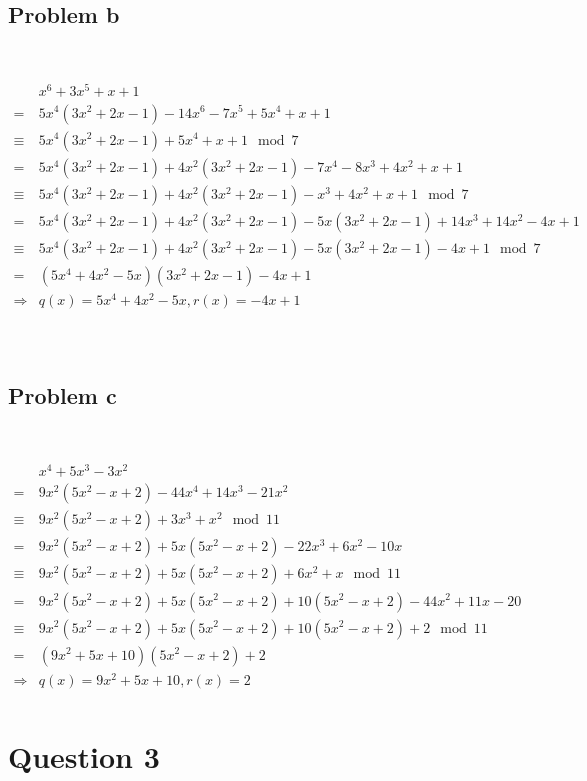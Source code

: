 \documentclass{article}
\begin{document}
~

\subsection*{Problem b}

~

\begin{align*}
    &x^6+3x^5+x+1\\
    =&5x^4(3x^2+2x-1)-14x^6-7x^5+5x^4+x+1\\
    \equiv&5x^4(3x^2+2x-1)+5x^4+x+1\mod 7\\
    =&5x^4(3x^2+2x-1)+4x^2(3x^2+2x-1)-7x^4-8x^3+4x^2+x+1\\
    \equiv&5x^4(3x^2+2x-1)+4x^2(3x^2+2x-1)-x^3+4x^2+x+1\mod 7\\
    =&5x^4(3x^2+2x-1)+4x^2(3x^2+2x-1)-5x(3x^2+2x-1)+14x^3+14x^2-4x+1\\
    \equiv&5x^4(3x^2+2x-1)+4x^2(3x^2+2x-1)-5x(3x^2+2x-1)-4x+1\mod 7\\
    =&(5x^4+4x^2-5x)(3x^2+2x-1)-4x+1\\
    \Rightarrow&q(x)=5x^4+4x^2-5x,r(x)=-4x+1\\
\end{align*}

~

\subsection*{Problem c}

~

\begin{align*}
    &x^4+5x^3-3x^2\\
    =&9x^2(5x^2-x+2)-44x^4+14x^3-21x^2\\
    \equiv&9x^2(5x^2-x+2)+3x^3+x^2\mod 11\\
    =&9x^2(5x^2-x+2)+5x(5x^2-x+2)-22x^3+6x^2-10x\\
    \equiv&9x^2(5x^2-x+2)+5x(5x^2-x+2)+6x^2+x\mod 11\\
    =&9x^2(5x^2-x+2)+5x(5x^2-x+2)+10(5x^2-x+2)-44x^2+11x-20\\
    \equiv&9x^2(5x^2-x+2)+5x(5x^2-x+2)+10(5x^2-x+2)+2\mod 11\\
    =&(9x^2+5x+10)(5x^2-x+2)+2\\
    \Rightarrow&q(x)=9x^2+5x+10,r(x)=2\\
\end{align*}

\newpage

\section*{Question 3}
\end{document}
